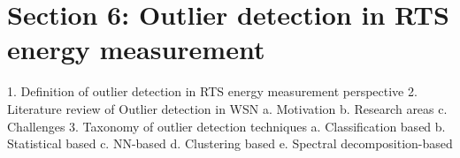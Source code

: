 




\section{Section 6: Outlier detection in RTS energy measurement}


1.	Definition of outlier detection in RTS energy measurement perspective
2.	Literature review of Outlier detection in WSN
a.	Motivation
b.	Research areas
c.	Challenges
3.	Taxonomy of outlier detection techniques
a.	Classification based
b.	Statistical based
c.	NN-based
d.	Clustering based
e.	Spectral decomposition-based